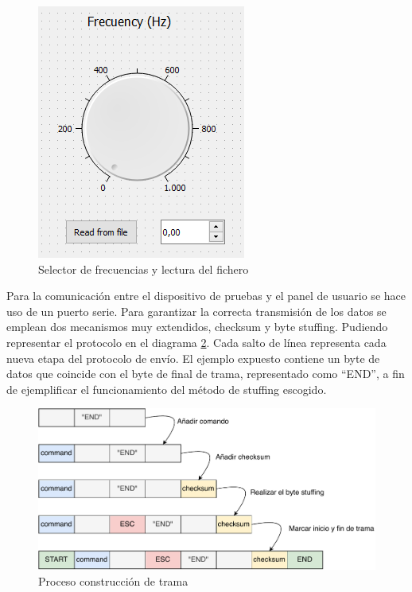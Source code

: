         \begin{figure}[H]
                \centering
                        \includegraphics[width =0.4\linewidth]{figuras/FrecKnob.png}
                \caption{Selector de frecuencias y lectura del fichero}
                \label{fig:frecKnob}
        \end{figure}

        Para la comunicación entre el dispositivo de pruebas y el panel de usuario se hace uso de un puerto serie. Para garantizar la correcta transmisión de los datos se emplean dos mecanismos muy extendidos, checksum y byte stuffing. Pudiendo representar el protocolo en el diagrama \ref{fig:frame}. Cada salto de línea representa cada nueva etapa del protocolo de envío. El ejemplo expuesto contiene un byte de datos que coincide con el byte de final de trama, representado como “END”, a fin de ejemplificar el funcionamiento del método de stuffing escogido.

        \begin{figure}[H]
                \centering
                        \includegraphics[width = \linewidth]{figuras/ProtocoloCom.pdf}
                \caption{Proceso construcción de trama}
                \label{fig:frame}
        \end{figure}

